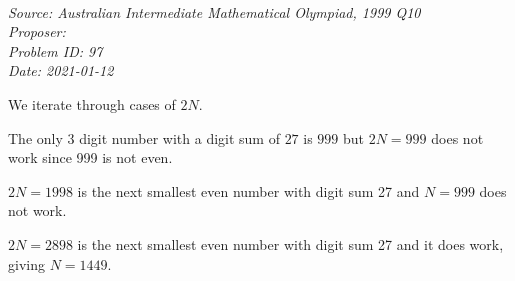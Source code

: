   
\SSbreak\\
\emph{Source: Australian Intermediate Mathematical Olympiad, 1999 Q10}\\
\emph{Proposer: \Pbrain}\\ %
\emph{Problem ID: 97}\\
\emph{Date: 2021-01-12}\\
\SSbreak

\bigskip

\begin{solution}\hfil\medskip

We iterate through cases of $2N$. \smallskip

The only 3 digit number with a digit sum of $27$ is $999$ but $2N = 999$ does not work since 999 is not even. \smallskip

$2N = 1998$ is the next smallest even number with digit sum 27 and $N = 999$ does not work. \smallskip

$2N = 2898$ is the next smallest even number with digit sum 27 and it does work, giving $N = \boxed{1449}$. 
\end{solution}\bigskip
